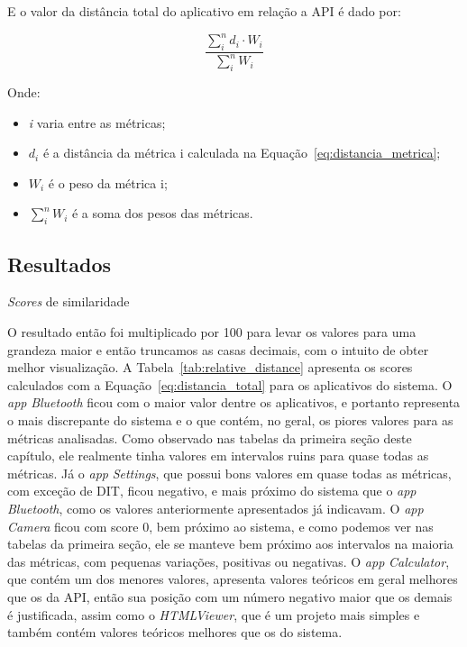 E o valor da distância total do aplicativo em relação a API é dado por:

\begin{center}
\begin{equation} \label{eq:distancia_total}
\displaystyle \frac{\sum_{i}^{n} d_i\cdot W_i}{\sum_{i}^{n} W_i}
\end{equation}
\end{center}

Onde:
\begin{itemize}
\item \textit{i} varia entre as métricas;
\item $d_i$ é a distância da métrica i calculada na Equação~\ref{eq:distancia_metrica};
\item $W_i$ é o peso da métrica i;
\item $\sum_{i}^{n} W_i$ é a soma dos pesos das métricas.
\end{itemize}

\subsection{Resultados}

\begin{table}[!htb]
\centering
{}

\caption{\textit{Scores} de similaridade}
\label{tab:relative_distance}
\end{table}

O resultado então foi multiplicado por 100 para levar os valores para uma grandeza maior e então truncamos as casas decimais, com o intuito de obter melhor visualização. A Tabela~\ref{tab:relative_distance} apresenta os scores calculados com a Equação~\ref{eq:distancia_total} para os aplicativos do sistema. O \textit{app} \textit{Bluetooth} ficou com o maior valor dentre os aplicativos, e portanto representa o mais discrepante do sistema e o que contém, no geral, os piores valores para as métricas analisadas. Como observado nas tabelas da primeira seção deste capítulo, ele realmente tinha valores em intervalos ruins para quase todas as métricas. Já o \textit{app} \textit{Settings}, que possui bons valores em quase todas as métricas, com exceção de DIT, ficou negativo, e mais próximo do sistema que o \textit{app} \textit{Bluetooth}, como os valores anteriormente apresentados já indicavam. O \textit{app} \textit{Camera} ficou com score 0, bem próximo ao sistema, e como podemos ver nas tabelas da primeira seção, ele se manteve bem próximo aos intervalos na maioria das métricas, com pequenas variações, positivas ou negativas. O \textit{app} \textit{Calculator}, que contém um dos menores valores, apresenta valores teóricos em geral melhores que os da API, então sua posição com um número negativo maior que os demais é justificada, assim como o \textit{HTMLViewer}, que é um projeto mais simples e também contém valores teóricos melhores que os do sistema.

